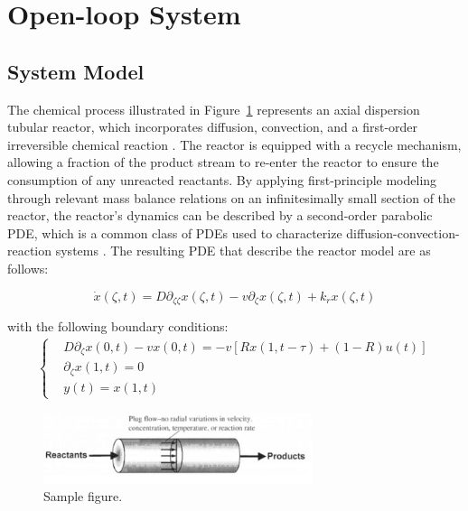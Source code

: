 \newpage
\section{Open-loop System}

\subsection{System Model}

The chemical process illustrated in Figure~\ref{fig:reactor_scheme} represents an axial dispersion tubular reactor, which incorporates diffusion, convection, and a first-order irreversible chemical reaction \autocite{levenspiel1998chemical}. The reactor is equipped with a recycle mechanism, allowing a fraction of the product stream to re-enter the reactor to ensure the consumption of any unreacted reactants. By applying first-principle modeling through relevant mass balance relations on an infinitesimally small section of the reactor, the reactor's dynamics can be described by a second-order parabolic PDE, which is a common class of PDEs used to characterize diffusion-convection-reaction systems \autocite{jensen1982bifurcation}. The resulting PDE that describe the reactor model are as follows:

\begin{equation}
    \dot{x}(\zeta, t) = D \partial_{\zeta \zeta} x(\zeta, t) - v \partial_\zeta x(\zeta, t) + k_r x(\zeta, t)
\end{equation}

with the following boundary conditions:
\begin{align}
    \begin{cases}
        &D \partial_\zeta x(0, t) - v x(0, t) = -v \left[ R x(1, t-\tau) + (1-R) u(t) \right] \\
        &\partial_\zeta x(1, t) = 0 \\
        &y(t) = x(1, t)
    \end{cases}
\end{align}

\begin{figure}[ht]
    \centering
    \includegraphics[width=0.7\textwidth]{Figures/sample.jpeg}
    \caption{Sample figure.}
    \label{fig:reactor_scheme}
\end{figure}